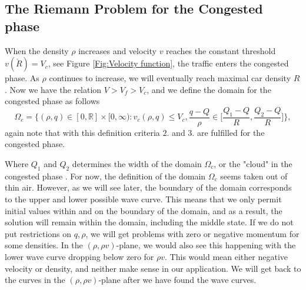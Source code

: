 \documentclass[10pt]{article}
\numberwithin{equation}{section}
\begin{document}
\subsection{The Riemann Problem for the Congested phase}\label{RPCongPh}
When the density $\rho$ increases and velocity $v$ reaches the constant threshold $v(\check R) = V_c$, see Figure \ref{Fig:Velocity function}, the traffic enters the congested phase. As $\rho$ continues to increase, we will eventually reach maximal car density $R$. Now we have the relation $ V > V_f > V_c $, and we define the domain for the congested phase as follows \begin{equation}
    \Omega_c = \Bigg\{(\rho, q) \in [0, \mathbb{R}] \times [0, \infty) : v_c(\rho, q) \leq V_c, \frac{q-Q}{\rho} \in \Bigg[\frac{Q_1 - Q}{R}, \frac{Q_2 - Q}{R} \Bigg]  \Bigg\},
    \label{Domain congested ph}
\end{equation} again note that with this definition criteria $2.$ and $3.$ are fulfilled for the congested phase. 
\begin{figure}
    
\end{figure}{}
Where $Q_1$ and $Q_2$ determines the width of the domain $\Omega_{c}$, or the "cloud" in the congested phase \cite{Colombo2003}.  For now, the definition of the domain $\Omega_c$ seems taken out of thin air. However, as we will see later, the boundary of the domain corresponds to the upper and lower possible wave curve. This means that we only permit initial values within and on the boundary of the domain, and as a result, the solution will remain within the domain, including the middle state. If we do not put restrictions on $q, \rho$, we will get problems with zero or negative momentum for some densities. In the $(\rho , \rho v)$-plane, we would also see this happening with the lower wave curve dropping below zero for $\rho v$. This would mean either negative velocity or density, and neither make sense in our application. We will get back to the curves in the $(\rho , \rho v)$-plane after we have found the wave curves.
\end{document}
